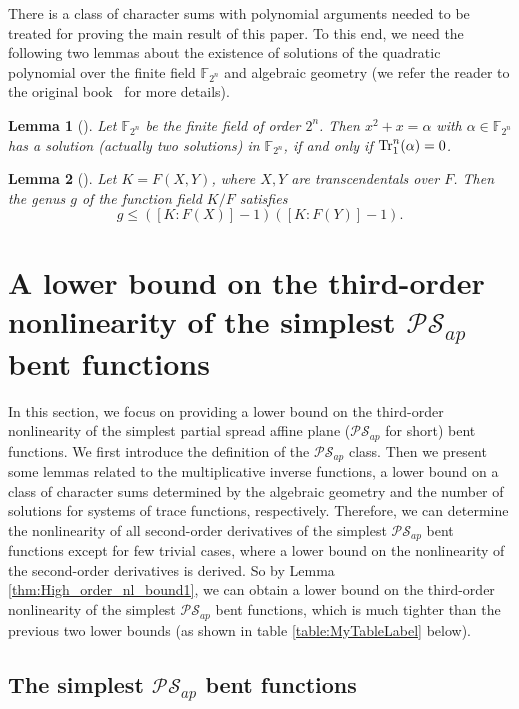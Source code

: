 \documentclass{article}
\newcommand{\F}{\mathbb{F}}
\newcommand{\0}{\textbf{0}}
\newcommand{\1}{\textbf{1}}
\theoremstyle{plain}
\newtheorem{lemma}{Lemma}
\begin{document}
    There is a class of character sums with polynomial arguments needed to be treated for proving the main result of this paper.
    To this end, we need the following two lemmas about the existence of solutions of the quadratic polynomial over the finite field $\F_{2^n}$ and algebraic geometry (we refer the reader to the original book~\cite{Stichtenoth2008book_algebraicfunctionfieldsandcodes} for more details).
    \begin{lemma}[\cite{Lidl1997FiniteFieldBook}]\label{lemma:hilbert90}
        Let $\F_{2^n}$ be the finite field of order $2^n$.
        Then $x^2+x=\alpha$ with $\alpha\in\F_{2^n}$ has a solution (actually two solutions) in $\F_{2^n}$, if and only if $\Tr_1^n(\alpha)=0$.
    \end{lemma}
    \begin{lemma}[\cite{Stichtenoth2008book_algebraicfunctionfieldsandcodes}]\label{L:genus_K_F}
        Let $K=F(X,Y)$, where $X,Y$ are transcendentals over $F$.
        Then the genus $g$ of the function field $K/F$ satisfies
        \[g\le ([K : F(X)] - 1)([K : F(Y)] - 1).\]
    \end{lemma}

\section{A lower bound on the third-order nonlinearity of the simplest $\mathcal{PS}_{ap}$ bent functions}

In this section, we focus on providing a lower bound on the third-order nonlinearity of the simplest
partial spread affine plane ($\mathcal{PS}_{ap}$ for short) bent functions.
We first introduce the definition of the $\mathcal{PS}_{ap}$ class.
Then we present some lemmas related to the multiplicative inverse functions,
a lower bound on a class of character sums determined by the algebraic geometry
and the number of solutions for systems of trace functions, respectively.
Therefore, we can determine the nonlinearity of all second-order derivatives of the simplest $\mathcal{PS}_{ap}$ bent functions except for few trivial cases, where a lower bound on the nonlinearity of the second-order derivatives is derived. 
So by Lemma \ref{thm:High_order_nl_bound1}, we can obtain a lower bound on the third-order nonlinearity of the simplest $\mathcal{PS}_{ap}$
bent functions, which is much tighter than the previous two lower bounds (as shown in table \ref{table:MyTableLabel} below).

  \subsection{The simplest $\mathcal{PS}_{ap}$ bent functions}
\end{document}
